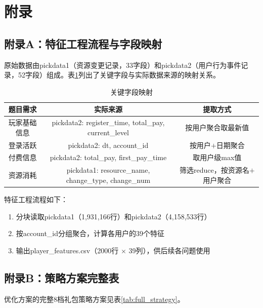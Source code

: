 \appendix
\section{附录}

\subsection{附录A：特征工程流程与字段映射}

原始数据由pickdata1（资源变更记录，33字段）和pickdata2（用户行为事件记录，52字段）组成。表\ref{tab:field_map}列出了关键字段与实际数据来源的映射关系。

\begin{table}[H]
\centering
\caption{关键字段映射}
\label{tab:field_map}
\begin{tabular}{c|c|c}
\toprule
\textbf{题目需求} & \textbf{实际来源} & \textbf{提取方式} \\
\midrule
玩家基础信息 & pickdata2: register\_time, total\_pay, current\_level & 按用户聚合取最新值 \\
登录活跃 & pickdata2: dt, account\_id & 按用户$+$日期聚合 \\
付费信息 & pickdata2: total\_pay, first\_pay\_time & 取用户级max值 \\
资源消耗 & pickdata1: resource\_name, change\_type, change\_num & 筛选reduce，按资源名$+$用户聚合 \\
\bottomrule
\end{tabular}
\end{table}

特征工程流程如下：
\begin{enumerate}
    \item 分块读取pickdata1（1,931,166行）和pickdata2（4,158,533行）
    \item 按account\_id分组聚合，计算各用户的39个特征
    \item 输出player\_features.csv（2000行 $\times$ 39列），供后续各问题使用
\end{enumerate}

\subsection{附录B：策略方案完整表}

优化方案的完整8档礼包策略方案见表\ref{tab:full_strategy}。

